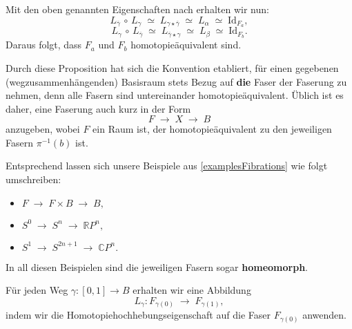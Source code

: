 \documentclass[12pt]{article}
\numberwithin{conj}{section}
\begin{document}
                \smallskip
                
                Mit den oben genannten Eigenschaften nach \cite[Prop.~4.61]{hatcher2001} erhalten wir nun:
                \[
                    L_{\overline{\gamma}} \,\circ\, L_\gamma
                    \;\simeq\;
                    L_{\gamma \star \overline{\gamma}}
                    \;\simeq\;
                    L_\alpha
                    \;\simeq\;
                    \mathrm{Id}_{F_a},
                \]
                \[
                    L_{\gamma} \,\circ\, L_{\overline{\gamma}}
                    \;\simeq\;
                    L_{\overline{\gamma} \star \gamma}
                    \;\simeq\;
                    L_\beta
                    \;\simeq\;
                    \mathrm{Id}_{F_b}.
                \]
                Daraus folgt, dass \(F_a\) und \(F_b\) homotopieäquivalent sind.
                
                \smallskip
                
                Durch diese Proposition hat sich die Konvention etabliert, für einen gegebenen (wegzusammenhängenden) Basisraum stets Bezug auf \textbf{die} Faser der Faserung zu nehmen, denn alle Fasern sind untereinander homotopieäquivalent. Üblich ist es daher, eine Faserung auch kurz in der Form
                \[
                    F \;\longrightarrow\; X \;\longrightarrow\; B
                \]
                anzugeben, wobei \(F\) ein Raum ist, der homotopieäquivalent zu den jeweiligen Fasern \(\pi^{-1}(b)\) ist.
                
                \smallskip
                
                Entsprechend lassen sich unsere Beispiele aus \autoref{examplesFibrations} wie folgt umschreiben:
                \begin{itemize}[nolistsep]
                    \item \(F \;\longrightarrow\; F \times B \;\longrightarrow\; B,\)
                    \item \(S^0 \;\longrightarrow\; S^n \;\longrightarrow\; \mathbb{R}P^n,\)
                    \item \(S^1 \;\longrightarrow\; S^{2n+1} \;\longrightarrow\; \mathbb{C}P^n.\)
                \end{itemize}
                In all diesen Beispielen sind die jeweiligen Fasern sogar \textbf{homeomorph}. 
                
                \noindent
                Für jeden Weg \(\gamma : [0,1] \to B\) erhalten wir eine Abbildung 
                \[
                    L_\gamma : F_{\gamma(0)} \;\longrightarrow\; F_{\gamma(1)},
                \]
                indem wir die Homotopiehochhebungseigenschaft auf die Faser \(F_{\gamma(0)}\) anwenden.
                
\end{document}
